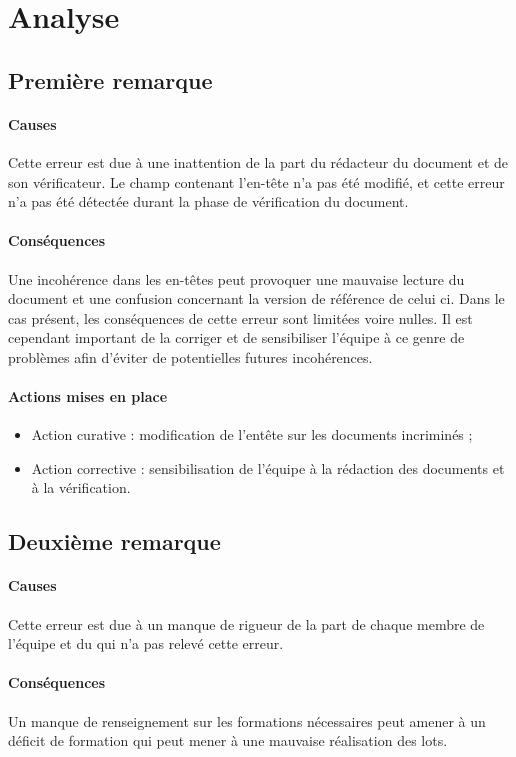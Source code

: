 \documentclass[asi]{picInsa}
\begin{document}
\section{Analyse}
\subsection{Première remarque}
\paragraph*{Causes} Cette erreur est due à une inattention de la part du rédacteur du document et de son vérificateur. Le champ contenant l'en-tête n'a pas été modifié, et cette erreur n’a pas été détectée durant la phase de vérification du document.

\paragraph*{Conséquences} Une incohérence dans les en-têtes peut provoquer une mauvaise lecture du document et une confusion concernant la version de référence de celui ci. Dans le cas présent, les conséquences de cette erreur sont limitées voire nulles. Il est cependant important de la corriger et de sensibiliser l’équipe à ce genre de problèmes afin d’éviter de potentielles futures incohérences.

\paragraph*{Actions mises en place}
\begin{itemize}
\item Action curative : modification de l'entête sur les documents incriminés ;
\item Action corrective : sensibilisation de l'équipe à la rédaction des documents et à la vérification.
\end{itemize}


\subsection{Deuxième remarque}
\paragraph*{Causes} Cette erreur est due à un manque de rigueur de la part de chaque membre de l'équipe et du \RQ{} qui n'a pas relevé cette erreur.

\paragraph*{Conséquences} Un manque de renseignement sur les formations nécessaires peut amener à un déficit de formation qui peut mener à une mauvaise réalisation des lots.
\end{document}
